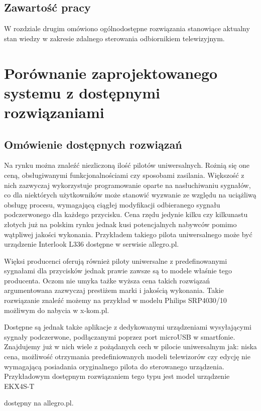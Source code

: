 \documentclass[12pt,twoside,draft]{article}
\begin{document}
\subsection{Zawartość pracy}
W rozdziale drugim  omówiono ogólnodostępne rozwiązania stanowiące aktualny stan wiedzy w zakresie zdalnego sterowania odbiornikiem telewizyjnym.

\clearpage
\section{Porównanie zaprojektowanego systemu z do\-stęp\-ny\-mi rozwiązaniami}
\subsection{Omówienie dostępnych rozwiązań}
{Na rynku można znaleźć niezliczoną ilość pilotów uniwersalnych. Rożnią się one 
ceną, obsługiwanymi funkcjonalnościami czy sposobami zasilania. Większość z nich zazwyczaj 
wykorzystuje programowanie oparte na nasłuchiwaniu sygnałów, co dla niektórych użytkowników może stanowić 
wyzwanie ze względu na uciążliwą obsługę procesu, wymagającą ciągłej modyfikacji odbieranego 
sygnału podczerwonego dla każdego przycisku. Cena rzędu jedynie kilku czy kilkunastu złotych 
już na polskim rynku jednak kusi potencjalnych nabywców pomimo wątpliwej jakości wykonania. Przykładem 
takiego pilota uniwersalnego może być urządzenie Interlook L336\cite{cheapController} dostępne w serwisie allegro.pl. 

Więksi producenci oferują również piloty uniwersalne z predefinowanymi sygnałami dla przycisków jednak
prawie zawsze są to modele właśnie tego producenta. Oczom nie umyka tażke wyższa cena takich
rozwiązań argumentowana zazwyczaj prestiżem marki i jakością wykonania. Takie rozwiązanie znaleźć
możemy na przykład w modelu Philips SRP4030/10\cite{expensiveController} możliwym do nabycia w x-kom.pl.

Dostępne są jednak także aplikacje z dedykowanymi urządzeniami wysyłającymi sygnały podczerwone, 
podłączanymi poprzez port microUSB w smartfonie. Znajdujemy już w nich wiele z pożądanych cech w pilocie
 uniwersalnym jak: niska cena, możliwość otrzymania predefiniowanych modeli telewizorów 
 czy edycję nie wymagającą posiadania oryginalnego pilota do sterowanego urządzenia. Przykładowym dostępnym
rozwiązaniem tego typu jest model urządzenie EKX4S-T\cite{appController}} dostępny na allegro.pl.
\end{document}
